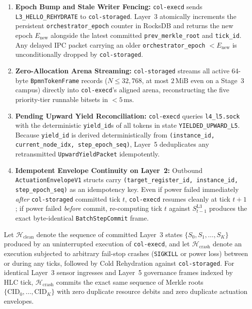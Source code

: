 \begin{enumerate}
\item \textbf{Epoch Bump and Stale Writer Fencing:} \texttt{col-execd} sends
        \texttt{L3\_HELLO\_REHYDRATE} to \texttt{col-storaged}. Layer~3 atomically
        increments the persistent \texttt{orchestrator\_epoch} counter in RocksDB and
        returns the new epoch $E_{\mathrm{new}}$ alongside the latest committed
        \texttt{prev\_merkle\_root} and \texttt{tick\_id}. Any delayed IPC packet carrying
        an older \texttt{orchestrator\_epoch} $< E_{\mathrm{new}}$ is unconditionally
        dropped by \texttt{col-storaged}.
\item \textbf{Zero-Allocation Arena Streaming:} \texttt{col-storaged} streams all active
        64-byte \texttt{BpmnTokenFrame} records ($N \le 32{,}768$, at most $2\,\mathrm{MiB}$
        even on a Stage~3 campus) directly into \texttt{col-execd}'s aligned arena,
        reconstructing the five priority-tier runnable bitsets in $< 5\,\mathrm{ms}$.
\item \textbf{Pending Upward Yield Reconciliation:} \texttt{col-execd} queries
        \texttt{l4\_l5.sock} with the deterministic \texttt{yield\_id}s of all tokens in
        state \texttt{YIELDED\_UPWARD\_L5}. Because \texttt{yield\_id} is derived
        deterministically from \texttt{(instance\_id, current\_node\_idx,
        step\_epoch\_seq)}, Layer~5 deduplicates any retransmitted
        \texttt{UpwardYieldPacket} idempotently.
\item \textbf{Idempotent Envelope Continuity on Layer~2:} Outbound
        \texttt{ActuationEnvelopeV1} structs carry \texttt{(target\_register\_id,
        instance\_id, step\_epoch\_seq)} as an idempotency key. Even if power failed
        immediately \textit{after} \texttt{col-storaged} committed tick $t$,
        \texttt{col-execd} resumes cleanly at tick $t+1$; if power failed \textit{before}
        commit, re-computing tick $t$ against $S_{t-1}^{\mathrm{L3}}$ produces the exact
        byte-identical \texttt{BatchStepCommit} frame.
\end{enumerate}

\begin{invariant}
\label{inv:ch3-crash-equivalence}
Let $\mathcal{H}_{\mathrm{clean}}$ denote the sequence of committed Layer~3 states $\{S_0, S_1, \dots, S_K\}$
produced by an uninterrupted execution of \texttt{col-execd}, and let
$\mathcal{H}_{\mathrm{crash}}$ denote an execution subjected to arbitrary fail-stop crashes
(\texttt{SIGKILL} or power loss) between or during any ticks, followed by Cold Rehydration
against \texttt{col-storaged}. For identical Layer~3 sensor ingresses and Layer~5 governance
frames indexed by HLC tick, $\mathcal{H}_{\mathrm{crash}}$ commits the exact same sequence
of Merkle roots $\{\mathrm{CID}_0, \dots, \mathrm{CID}_K\}$ with zero duplicate resource
debits and zero duplicate actuation envelopes.
\end{invariant}

